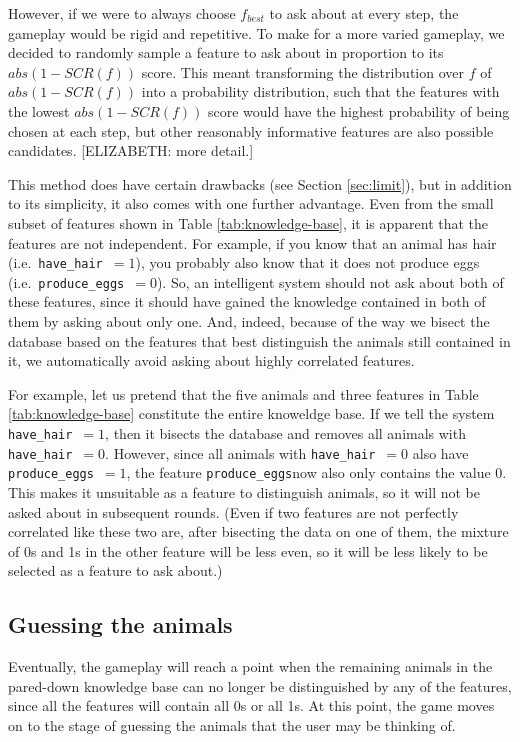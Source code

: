 \documentclass[11pt,a4paper]{article}
\newcommand{\havehair}{\texttt{have\_hair}}
\newcommand{\produceeggs}{\texttt{produce\_eggs}}
\begin{document}
However, if we were to always choose $f_{best}$ to ask about at every step, the gameplay would be rigid and repetitive.
To make for a more varied gameplay, we decided to randomly sample a feature to ask about in proportion to its $abs(1 - SCR(f))$ score. 
This meant transforming the distribution over $f$ of $abs(1 - SCR(f))$ into a probability distribution, such that the features with the lowest $abs(1 - SCR(f))$ score would have the highest probability of being chosen at each step, but other reasonably informative features are also possible candidates.
[ELIZABETH: more detail.]

This method does have certain drawbacks (see Section \ref{sec:limit}), but in addition to its simplicity, it also comes with one further advantage.
Even from the small subset of features shown in Table \ref{tab:knowledge-base}, it is apparent that the features are not independent.
For example, if you know that an animal has hair (i.e.\ \havehair\ $= 1$), you probably also know that it does not produce eggs (i.e.\ \produceeggs\ $= 0$).
So, an intelligent system should not ask about both of these features, since it should have gained the knowledge contained in both of them by asking about only one.
And, indeed, because of the way we bisect the database based on the features that best distinguish the animals still contained in it, we automatically avoid asking about highly correlated features.

For example, let us pretend that the five animals and three features in Table \ref{tab:knowledge-base} constitute the entire knoweldge base.
If we tell the system \havehair\ $= 1$, then it bisects the database and removes all animals with \havehair\ $= 0$.
However, since all animals with \havehair\ $= 0$ also have \produceeggs\ $= 1$, the feature \produceeggs now also only contains the value 0.
This makes it unsuitable as a feature to distinguish animals, so it will not be asked about in subsequent rounds.
(Even if two features are not perfectly correlated like these two are, after bisecting the data on one of them, the mixture of 0s and 1s in the other feature will be less even, so it will be less likely to be selected as a feature to ask about.)

\subsection{Guessing the animals}
\label{subsec:guess-animals}

Eventually, the gameplay will reach a point when the remaining animals in the pared-down knowledge base can no longer be distinguished by any of the features, since all the features will contain all 0s or all 1s.
At this point, the game moves on to the stage of guessing the animals that the user may be thinking of.
\end{document}
